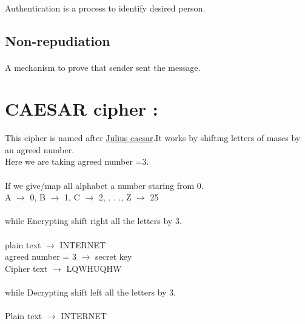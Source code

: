 \documentclass[11pt]{article}
\begin{document}
\begin{multicols}{2}
\paragraph{}{Authentication is a process to identify desired person.}
\subsection{Non-repudiation}
\paragraph{}{A mechanism to prove that sender sent the message.}
\end{multicols}

\newpage

\section{CAESAR cipher :}
This cipher is named after \underline{Julius caesar}.It works by shifting letters of mases by an agreed number.\\
 Here we are taking agreed number =3.\\\\
 If we give/map all alphabet a number staring from 0.\\
 A $\rightarrow$ 0,
 B $\rightarrow$ 1,
 C $\rightarrow$ 2,
 .
 .
 .,
 Z $\rightarrow$ 25\\
 \\
 while Encrypting shift right all the letters by 3.\\\\
 plain text  $\rightarrow$ INTERNET\\
 agreed number = 3 $\rightarrow$ secret key \\
 Cipher text $\rightarrow$ LQWHUQHW\\\\
 while Decrypting shift left all the letters by 3.\\\\
Plain text $\rightarrow$ INTERNET\\
\end{document}
